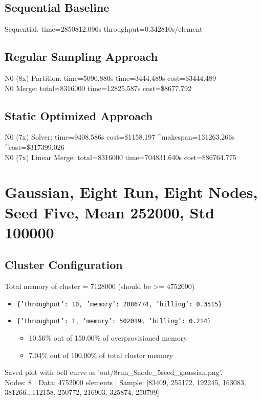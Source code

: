 \documentclass[]{interact}
\theoremstyle{plain}
\theoremstyle{definition}
\theoremstyle{remark}
\begin{document}
\subsection{Sequential Baseline}
Sequential: time=2850812.096\textmu s throughput=0.342810\textmu s/element

\subsection{Regular Sampling Approach}
N0 (8x) Partition: time=5090.880\textmu s time=3444.489\textmu s cost=\$3444.489\\
N0 Merge: total=8316000 time=12825.587\textmu s cost=\$8677.792

\subsection{Static Optimized Approach}
N0 (7x) Solver: time=9408.586\textmu s cost=\$1158.197 \^{}makespan=131263.266\textmu s \^{}cost=\$317399.026\\
N0 (7x) Linear Merge: total=8316000 time=704831.640\textmu s cost=\$86764.775

\clearpage

\section{Gaussian, Eight Run, Eight Nodes, Seed Five, Mean 252000, Std 100000}

\subsection{Cluster Configuration}
Total memory of cluster = 7128000 (should be >= 4752000)
\begin{itemize}
    \item \texttt{\{'throughput': 10, 'memory': 2086774, 'billing': 0.3515\}}
    \item \texttt{\{'throughput': 1, 'memory': 502019, 'billing': 0.214\}}
    \begin{itemize}
        \item 10.56\% out of 150.00\% of overprovisioned memory
        \item 7.04\% out of 100.00\% of total cluster memory
    \end{itemize}
\end{itemize}
Saved plot with bell curve as 'out/8run\_8node\_5seed\_gaussian.png'.\\
Nodes: 8 | Data: 4752000 elements | Sample: [83409, 255172, 192245, 163083, 381266...112158, 250772, 216903, 325874, 250799]
\end{document}
